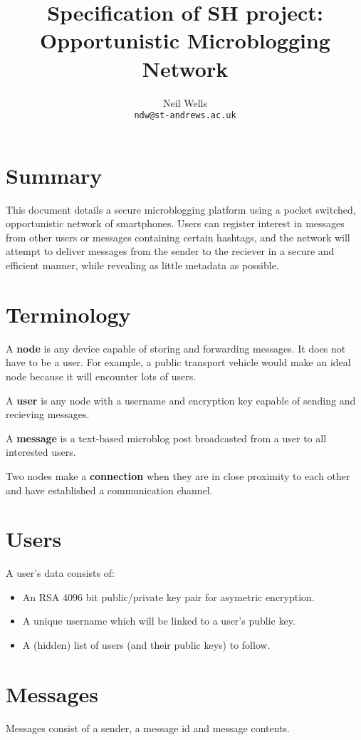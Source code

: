 \documentclass{article}
\title{\textbf{Specification of SH project: Opportunistic Microblogging Network}}
\author{Neil Wells\\
\texttt{ndw@st-andrews.ac.uk}}
\date{}
\begin{document}
\maketitle

\section*{Summary}
This document details a secure microblogging platform using a pocket switched, opportunistic network of smartphones. Users can register interest in messages from other users or messages containing certain hashtags, and the network will attempt to deliver messages from the sender to the reciever in a secure and efficient manner, while revealing as little metadata as possible.


\section*{Terminology}
A \textbf{node} is any device capable of storing and forwarding messages. It does not have to be a user. For example, a public transport vehicle would make an ideal node because it will encounter lots of users.

A \textbf{user} is any node with a username and encryption key capable of sending and recieving messages.

A \textbf{message} is a text-based microblog post broadcasted from a user to all interested users.

Two nodes make a \textbf{connection} when they are in close proximity to each other and have established a communication channel.

\section*{Users}
A user's data consists of:
\begin{itemize}
\item An RSA 4096 bit public/private key pair for asymetric encryption.
\item A unique username which will be linked to a user's public key.
\item A (hidden) list of users (and their public keys) to follow.
\end{itemize}

\section*{Messages}
Messages consist of a sender, a message id and message contents.
\end{document}
